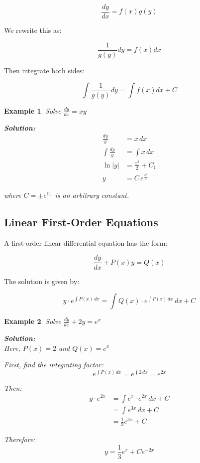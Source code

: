 \documentclass{article}
\newtheorem{example}{Example}
\begin{document}
\begin{equation}
\frac{dy}{dx} = f(x)g(y)
\end{equation}

We rewrite this as:

\begin{equation}
\frac{1}{g(y)}dy = f(x)dx
\end{equation}

Then integrate both sides:

\begin{equation}
\int\frac{1}{g(y)}dy = \int f(x)dx + C
\end{equation}

\begin{example}
Solve $\frac{dy}{dx} = xy$

\textbf{Solution:}
\begin{align}
\frac{dy}{y} &= x\,dx\\
\int\frac{dy}{y} &= \int x\,dx\\
\ln|y| &= \frac{x^2}{2} + C_1\\
y &= C\,e^{\frac{x^2}{2}}
\end{align}

where $C = \pm e^{C_1}$ is an arbitrary constant.
\end{example}

\subsection{Linear First-Order Equations}

A first-order linear differential equation has the form:

\begin{equation}
\frac{dy}{dx} + P(x)y = Q(x)
\end{equation}

The solution is given by:

\begin{equation}
y\cdot e^{\int P(x)\,dx} = \int Q(x)\cdot e^{\int P(x)\,dx}\,dx + C
\end{equation}

\begin{example}
Solve $\frac{dy}{dx} + 2y = e^x$

\textbf{Solution:}\\
Here, $P(x) = 2$ and $Q(x) = e^x$

First, find the integrating factor:
\begin{equation}
e^{\int P(x)\,dx} = e^{\int 2\,dx} = e^{2x}
\end{equation}

Then:
\begin{align}
y\cdot e^{2x} &= \int e^x \cdot e^{2x}\,dx + C\\
&= \int e^{3x}\,dx + C\\
&= \frac{1}{3}e^{3x} + C
\end{align}

Therefore:
\begin{equation}
y = \frac{1}{3}e^x + Ce^{-2x}
\end{equation}
\end{example}
\end{document}
